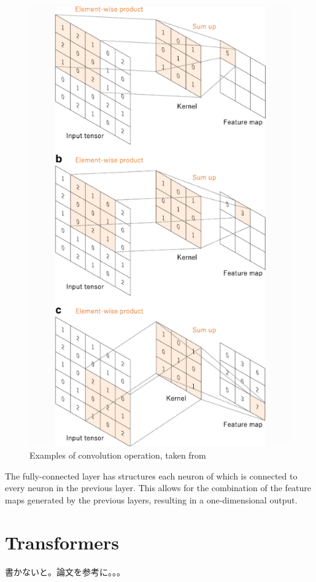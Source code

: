 \begin{figure}[p]
  \centering
  \includegraphics[width=110truemm]{resources/2_background/ex-convolution.png}
  \caption{
    Examples of convolution operation,
    taken from \cite{yamashita2018convolutional}
  }
  \label{convolution-process}
\end{figure}
\clearpage

The fully-connected layer has structures each neuron of which is connected 
to every neuron in the previous layer. This allows for the combination of 
the feature maps generated by the previous layers, resulting in a 
one-dimensional output.  

\section{Transformers}
書かないと。論文を参考に。。。
